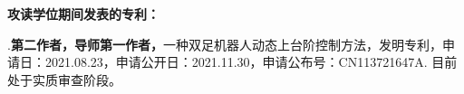 \cleardoublepage
{}
\textbf{ 攻读学位期间发表的专利：}

.\textbf{第二作者，导师第一作者，}一种双足机器人动态上台阶控制方法，发明专利，申请日：2021.08.23，申请公开日：2021.11.30，申请公布号：CN113721647A.
目前处于实质审查阶段。